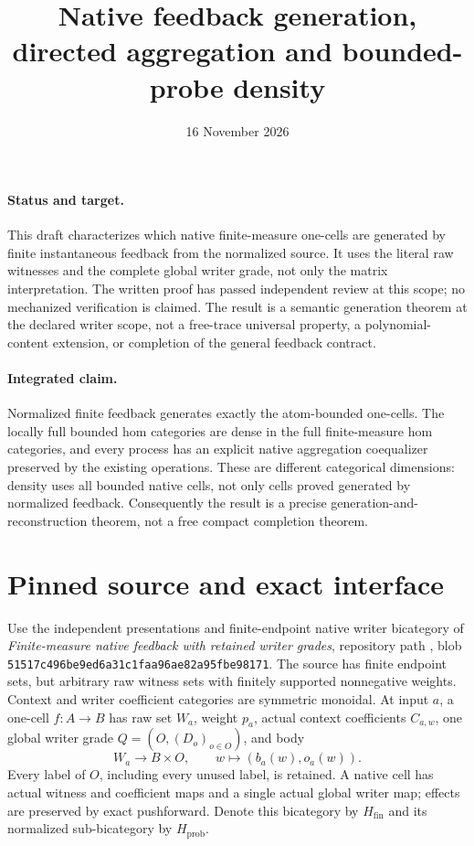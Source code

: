 \documentclass[11pt]{article}
\title{Native feedback generation, directed aggregation and bounded-probe density}
\date{16 November 2026}
\newcommand{\HN}{H_{\mathrm{prob}}}
\newcommand{\HM}{H_{\mathrm{fin}}}
\begin{document}
\maketitle
\paragraph{Status and target.}
This draft characterizes which native finite-measure one-cells are generated by finite instantaneous feedback from the normalized source. It uses the literal raw witnesses and the complete global writer grade, not only the matrix interpretation. The written proof has passed independent review at this scope; no mechanized verification is claimed. The result is a semantic generation theorem at the declared writer scope, not a free-trace universal property, a polynomial-content extension, or completion of the general feedback contract.

\paragraph{Integrated claim.} Normalized finite feedback generates exactly the atom-bounded one-cells. The locally full bounded hom categories are dense in the full finite-measure hom categories, and every process has an explicit native aggregation coequalizer preserved by the existing operations. These are different categorical dimensions: density uses all bounded native cells, not only cells proved generated by normalized feedback. Consequently the result is a precise generation-and-reconstruction theorem, not a free compact completion theorem.

\section{Pinned source and exact interface}
Use the independent presentations and finite-endpoint native writer bicategory of \emph{Finite-measure native feedback with retained writer grades}, repository path
, blob
\texttt{51517c496be9ed6a31c1faa96ae82a95fbe98171}.
The source has finite endpoint sets, but arbitrary raw witness sets with finitely supported nonnegative weights. Context and writer coefficient categories are symmetric monoidal. At input $a$, a one-cell $f:A\to B$ has raw set $W_a$, weight $p_a$, actual context coefficients $C_{a,w}$, one global writer grade $Q=(O,(D_o)_{o\in O})$, and body
\[
 W_a\longrightarrow B\times O,\qquad w\longmapsto (b_a(w),o_a(w)).
\]
Every label of $O$, including every unused label, is retained. A native cell has actual witness and coefficient maps and a single actual global writer map; effects are preserved by exact pushforward. Denote this bicategory by $\HM$ and its normalized sub-bicategory by $\HN$.
\end{document}
